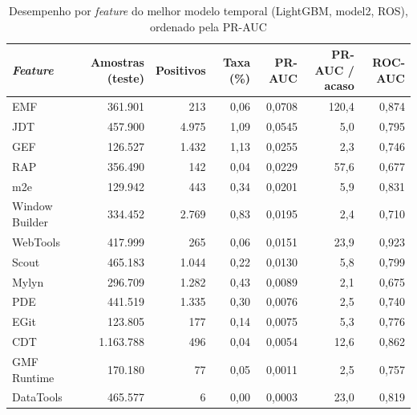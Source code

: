 \begin{table}[htbp]
    \centering
    \footnotesize
    \setlength{\tabcolsep}{5pt}%
    \caption{Desempenho por \textit{feature} do melhor modelo temporal (LightGBM, model2, ROS), ordenado pela PR-AUC}
    \label{tab:res-por-feature}
    \begin{tabular}{lrrrrrr}
        \toprule
        \textit{Feature} & Amostras (teste) & Positivos & Taxa (\%) & PR-AUC & PR-AUC / acaso & ROC-AUC \\
        \midrule
        EMF            &   361.901 &   213 & 0,06 & 0,0708 & 120,4 & 0,874 \\
        JDT            &   457.900 & 4.975 & 1,09 & 0,0545 &   5,0 & 0,795 \\
        GEF            &   126.527 & 1.432 & 1,13 & 0,0255 &   2,3 & 0,746 \\
        RAP            &   356.490 &   142 & 0,04 & 0,0229 &  57,6 & 0,677 \\
        m2e            &   129.942 &   443 & 0,34 & 0,0201 &   5,9 & 0,831 \\
        Window Builder &   334.452 & 2.769 & 0,83 & 0,0195 &   2,4 & 0,710 \\
        WebTools       &   417.999 &   265 & 0,06 & 0,0151 &  23,9 & 0,923 \\
        Scout          &   465.183 & 1.044 & 0,22 & 0,0130 &   5,8 & 0,799 \\
        Mylyn          &   296.709 & 1.282 & 0,43 & 0,0089 &   2,1 & 0,675 \\
        PDE            &   441.519 & 1.335 & 0,30 & 0,0076 &   2,5 & 0,740 \\
        EGit           &   123.805 &   177 & 0,14 & 0,0075 &   5,3 & 0,776 \\
        CDT            & 1.163.788 &   496 & 0,04 & 0,0054 &  12,6 & 0,862 \\
        GMF Runtime    &   170.180 &    77 & 0,05 & 0,0011 &   2,5 & 0,757 \\
        DataTools      &   465.577 &     6 & 0,00 & 0,0003 &  23,0 & 0,819 \\
        \bottomrule
    \end{tabular}
\end{table}%

